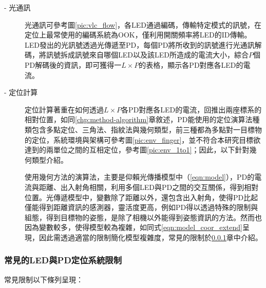         \begin{description}
            \item[- 光通訊]\hfill
            
            \qquad 
            光通訊可參考圖\ref{pic:vlc_flow}，各LED通過編碼，傳輸特定模式的訊號，在定位上最常使用的編碼系統為OOK，僅利用開關頻率將LED的ID傳輸。LED發出的光訊號透過光傳遞至PD，每個PD將所收到的訊號進行光通訊解碼，將訊號拆成訊號來自哪個LED以及該LED所造成的電流大小，綜合$P$個PD解碼後的資訊，即可獲得一$L\times P$的表格，顯示各PD對應各LED的電流。
            
            \item[- 定位計算] \hfill
            
            \qquad
            定位計算著重在如何透過$L\times P$各PD對應各LED的電流，回推出兩座標系的相對位置，如同\ref{chp:method-algorithm}章敘述，PD能使用的定位演算法種類包含多點定位、三角法、指紋法與幾何類型，前三種都為多點對一目標物的定位，系統環境與架構可參考圖\ref{pic:env_finger}，並不符合本研究目標欲達到的兩單位之間的互相定位，參考圖\ref{pic:env_1to1}；因此，以下針對幾何類型介紹。

            \qquad
            使用幾何方法的演算法，主要是仰賴光傳播模型中（\ref{eqn:model}），PD的電流與距離、出入射角相關，利用多個LED與PD之間的交互關係，得到相對位置。光傳遞模型中，變數除了距離以外，還包含出入射角，使得PD比起僅能得到距離資訊的感測器，靈活度更高，例如PD得以透過特殊的限制與組態，得到目標物的姿態\cite{case:orient}，是除了相機以外能得到姿態資訊的方法。然而也因為變數較多，使得模型較為複雜，如同式\ref{eqn:model_coor_extend}呈現，因此需透過適當的限制簡化模型複雜度，常見的限制於\ref{chp:LEDPD_restrict}章中介紹。
        \end{description}



        \subsubsection{常見的LED與PD定位系統限制}
        \label{chp:LEDPD_restrict}

        常見限制以下條列呈現：

